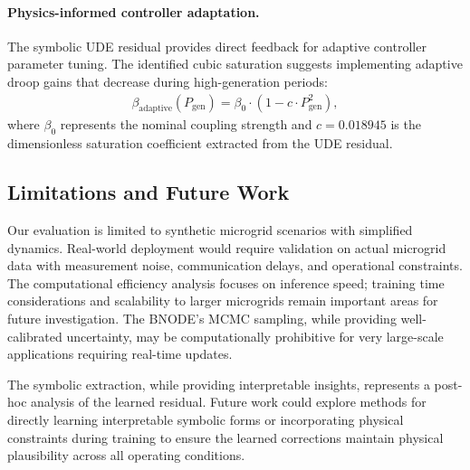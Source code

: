 \paragraph{Physics-informed controller adaptation.} The symbolic UDE residual provides direct feedback for adaptive controller parameter tuning. The identified cubic saturation suggests implementing adaptive droop gains that decrease during high-generation periods:
\begin{align}
\beta_{\text{adaptive}}(P_{\text{gen}}) = \beta_0 \cdot (1 - c \cdot P_{\text{gen}}^2),
\end{align}
where $\beta_0$ represents the nominal coupling strength and $c = 0.018945$ is the dimensionless saturation coefficient extracted from the UDE residual. %

\subsection{Limitations and Future Work}

Our evaluation is limited to synthetic microgrid scenarios with simplified dynamics. Real-world deployment would require validation on actual microgrid data with measurement noise, communication delays, and operational constraints. The computational efficiency analysis focuses on inference speed; training time considerations and scalability to larger microgrids remain important areas for future investigation. The BNODE's MCMC sampling, while providing well-calibrated uncertainty, may be computationally prohibitive for very large-scale applications requiring real-time updates.

The symbolic extraction, while providing interpretable insights, represents a post-hoc analysis of the learned residual. Future work could explore methods for directly learning interpretable symbolic forms or incorporating physical constraints during training to ensure the learned corrections maintain physical plausibility across all operating conditions.
